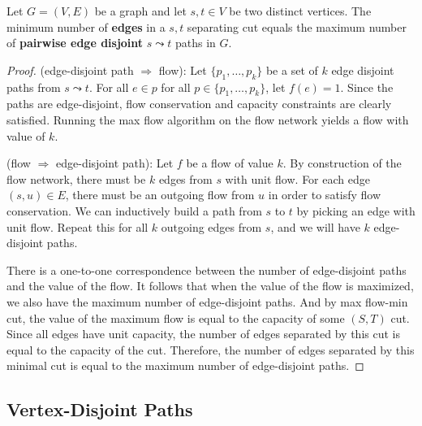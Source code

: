 \begin{theorem}
    Let $G=(V,E)$ be a graph and let $s,t \in V$ be two distinct vertices. The minimum number of \textbf{edges} in a $s,t$ separating cut equals the maximum number of \textbf{pairwise edge disjoint} $s \leadsto t$ paths in $G$.
\end{theorem}

\begin{proof}
    \hfill

    (edge-disjoint path $\Rightarrow$ flow): Let $\{p_1,\ldots,p_k\}$ be a set of $k$ edge disjoint paths from $s \leadsto t$. For all $e \in p$ for all $p \in \{p_1,\ldots,p_k\}$, let $f(e) = 1$. Since the paths are edge-disjoint, flow conservation and capacity constraints are clearly satisfied. Running the max flow algorithm on the flow network yields a flow with value of $k$.

    (flow $\Rightarrow$ edge-disjoint path): Let $f$ be a flow of value $k$. By construction of the flow network, there must be $k$ edges from $s$ with unit flow. For each edge $(s,u) \in E$, there must be an outgoing flow from $u$ in order to satisfy flow conservation. We can inductively build a path from $s$ to $t$ by picking an edge with unit flow. Repeat this for all $k$ outgoing edges from $s$, and we will have $k$ edge-disjoint paths.

    There is a one-to-one correspondence between the number of edge-disjoint paths and the value of the flow. It follows that when the value of the flow is maximized, we also have the maximum number of edge-disjoint paths. And by max flow-min cut, the value of the maximum flow is equal to the capacity of some $(S,T)$ cut. Since all edges have unit capacity, the number of edges separated by this cut is equal to the capacity of the cut. Therefore, the number of edges separated by this minimal cut is equal to the maximum number of edge-disjoint paths.
\end{proof}

\subsection{Vertex-Disjoint Paths}

